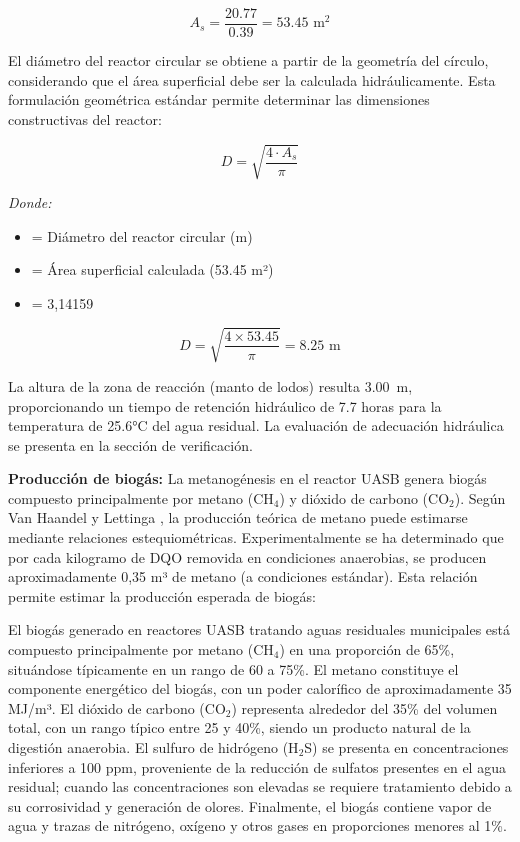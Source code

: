 \documentclass[12pt,a4paper]{article}
\begin{document}
\begin{equation}
A_s = \frac{20.77}{0.39} = 53.45 \text{ m}^2
\end{equation}

El diámetro del reactor circular se obtiene a partir de la geometría del círculo, considerando que el área superficial debe ser la calculada hidráulicamente. Esta formulación geométrica estándar permite determinar las dimensiones constructivas del reactor:

\begin{equation}
D = \sqrt{\frac{4 \cdot A_s}{\pi}}
\end{equation}

\textit{Donde:}
\begin{itemize}[noitemsep,leftmargin=2em]
    \item[$D$] = Diámetro del reactor circular (m)
    \item[$A_s$] = Área superficial calculada (53.45 m²)
    \item[$\pi$] = 3,14159
\end{itemize}

\begin{equation}
D = \sqrt{\frac{4 \times 53.45}{\pi}} = 8.25 \text{ m}
\end{equation}

La altura de la zona de reacción (manto de lodos) resulta 3.00~m, proporcionando un tiempo de retención hidráulico de 7.7 horas para la temperatura de 25.6°C del agua residual. La evaluación de adecuación hidráulica se presenta en la sección de verificación.

\textbf{Producción de biogás:} La metanogénesis en el reactor UASB genera biogás compuesto principalmente por metano (CH$_4$) y dióxido de carbono (CO$_2$). Según Van Haandel y Lettinga \cite{vanhaandel1994}, la producción teórica de metano puede estimarse mediante relaciones estequiométricas. Experimentalmente se ha determinado que por cada kilogramo de DQO removida en condiciones anaerobias, se producen aproximadamente 0,35 m³ de metano (a condiciones estándar). Esta relación permite estimar la producción esperada de biogás:

El biogás generado en reactores UASB tratando aguas residuales municipales está compuesto principalmente por metano (CH$_4$) en una proporción de 65\%, situándose típicamente en un rango de 60 a 75\%. El metano constituye el componente energético del biogás, con un poder calorífico de aproximadamente 35 MJ/m³. El dióxido de carbono (CO$_2$) representa alrededor del 35\% del volumen total, con un rango típico entre 25 y 40\%, siendo un producto natural de la digestión anaerobia. El sulfuro de hidrógeno (H$_2$S) se presenta en concentraciones inferiores a 100 ppm, proveniente de la reducción de sulfatos presentes en el agua residual; cuando las concentraciones son elevadas se requiere tratamiento debido a su corrosividad y generación de olores. Finalmente, el biogás contiene vapor de agua y trazas de nitrógeno, oxígeno y otros gases en proporciones menores al 1\%.
\end{document}
